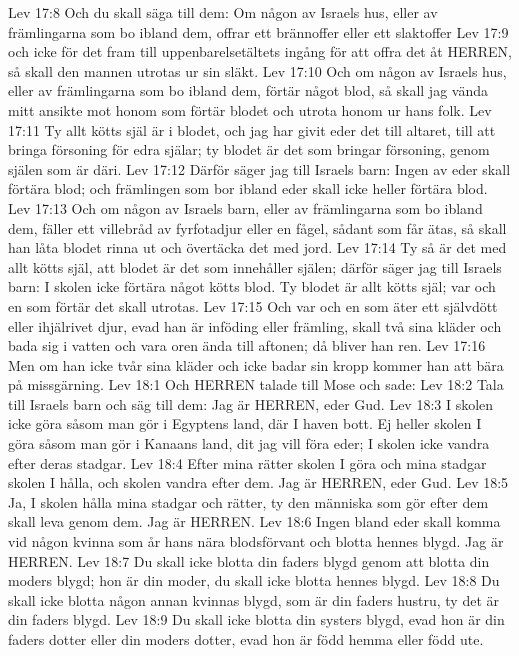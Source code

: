 Lev 17:8  Och du skall säga till dem: Om någon av Israels hus, eller av främlingarna som bo ibland dem, offrar ett brännoffer eller ett slaktoffer
Lev 17:9  och icke för det fram till uppenbarelsetältets ingång för att offra det åt HERREN, så skall den mannen utrotas ur sin släkt.
Lev 17:10  Och om någon av Israels hus, eller av främlingarna som bo ibland dem, förtär något blod, så skall jag vända mitt ansikte mot honom som förtär blodet och utrota honom ur hans folk.
Lev 17:11  Ty allt kötts själ är i blodet, och jag har givit eder det till altaret, till att bringa försoning för edra själar; ty blodet är det som bringar försoning, genom själen som är däri.
Lev 17:12  Därför säger jag till Israels barn: Ingen av eder skall förtära blod; och främlingen som bor ibland eder skall icke heller förtära blod.
Lev 17:13  Och om någon av Israels barn, eller av främlingarna som bo ibland dem, fäller ett villebråd av fyrfotadjur eller en fågel, sådant som får ätas, så skall han låta blodet rinna ut och övertäcka det med jord.
Lev 17:14  Ty så är det med allt kötts själ, att blodet är det som innehåller själen; därför säger jag till Israels barn: I skolen icke förtära något kötts blod. Ty blodet är allt kötts själ; var och en som förtär det skall utrotas.
Lev 17:15  Och var och en som äter ett självdött eller ihjälrivet djur, evad han är inföding eller främling, skall två sina kläder och bada sig i vatten och vara oren ända till aftonen; då bliver han ren.
Lev 17:16  Men om han icke tvår sina kläder och icke badar sin kropp kommer han att bära på missgärning.
Lev 18:1  Och HERREN talade till Mose och sade:
Lev 18:2  Tala till Israels barn och säg till dem: Jag är HERREN, eder Gud.
Lev 18:3  I skolen icke göra såsom man gör i Egyptens land, där I haven bott. Ej heller skolen I göra såsom man gör i Kanaans land, dit jag vill föra eder; I skolen icke vandra efter deras stadgar.
Lev 18:4  Efter mina rätter skolen I göra och mina stadgar skolen I hålla, och skolen vandra efter dem. Jag är HERREN, eder Gud.
Lev 18:5  Ja, I skolen hålla mina stadgar och rätter, ty den människa som gör efter dem skall leva genom dem. Jag är HERREN.
Lev 18:6  Ingen bland eder skall komma vid någon kvinna som år hans nära blodsförvant och blotta hennes blygd. Jag är HERREN.
Lev 18:7  Du skall icke blotta din faders blygd genom att blotta din moders blygd; hon är din moder, du skall icke blotta hennes blygd.
Lev 18:8  Du skall icke blotta någon annan kvinnas blygd, som är din faders hustru, ty det är din faders blygd.
Lev 18:9  Du skall icke blotta din systers blygd, evad hon är din faders dotter eller din moders dotter, evad hon är född hemma eller född ute.
